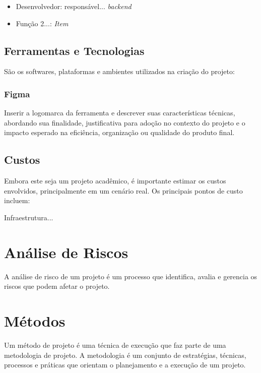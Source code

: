 \begin{itemize}
\item Desenvolvedor: responsável... \textit{backend} %
\item Função 2...: \textit{Item} %
\end{itemize}

\subsection{Ferramentas e Tecnologias}
São os softwares, plataformas e ambientes utilizados na criação do projeto:

\subsubsection {Figma} Inserir a logomarca da ferramenta e descrever suas características técnicas, abordando sua finalidade, justificativa para adoção no contexto do projeto e o impacto esperado na eficiência, organização ou qualidade do produto final.



\subsection{Custos}
Embora este seja um projeto acadêmico, é importante estimar os custos envolvidos, principalmente em um cenário real. Os principais pontos de custo incluem:

Infraestrutura...


\section{Análise de Riscos}
  
A análise de risco de um projeto é um processo que identifica, avalia e gerencia os riscos que podem afetar o projeto.

\section{Métodos}
  
Um método de projeto é uma técnica de execução que faz parte de uma metodologia de projeto. A metodologia é um conjunto de estratégias, técnicas, processos e práticas que orientam o planejamento e a execução de um projeto. 

